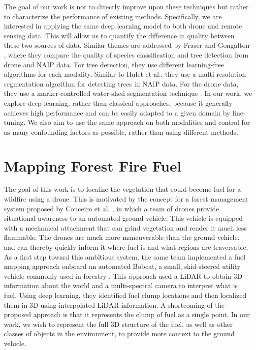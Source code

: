 The goal of our work is not to directly improve upon these techniques but rather to characterize the performance of existing methods. Specifically, we are interested in applying the same deep learning model to both drone and remote sensing data. This will allow us to quantify the difference in quality between these two sources of data. Similar themes are addressed by Fraser and Gongalton \cite{Fraser2021AImagery}, where they compare the quality of species classification and tree detection from drone and NAIP data. For tree detection, they use different learning-free algorithms for each modality. Similar to Hulet et al., they use a multi-resolution segmentation algorithm \cite{Baatz2000MultiresolutionS} for detecting trees in NAIP data. For the drone data, they use a marker-controlled water-shed segmentation technique \cite{Chen2018ReviewEvaluation}. In our work, we explore deep learning, rather than classical approaches, because it generally achieves high performance and can be easily adapted to a given domain by fine-tuning. We also aim to use the same approach on both modalities and control for as many confounding factors as possible, rather than using different methods.



\section{Mapping Forest Fire Fuel}
The goal of this work is to localize the vegetation that could become fuel for a wildfire using a drone. This is motivated by the concept for a forest management system proposed by Couceiro et al. \cite{Couceiro2019SEMFIRE:Systems}, in which a team of drones provide situational awareness to an automated ground vehicle. This vehicle is equipped with a mechanical attachment that can grind vegetation and render it much less flammable. The drones are much more maneuverable than the ground vehicle, and can thereby quickly inform it where fuel is and what regions are traversable. As a first step toward this ambitious system, the same team implemented a fuel mapping approach onboard an automated Bobcat, a small, skid-steered utility vehicle commonly used in forestry \cite{Andrada2022IntegrationRobotics}. This approach used a LiDAR to obtain 3D information about the world and a multi-spectral camera to interpret what is fuel. Using deep learning, they identified fuel clump locations and then localized them in 3D using interpolated LiDAR information. A shortcoming of the proposed approach is that it represents the clump of fuel as a single point. In our work, we wish to represent the full 3D structure of the fuel, as well as other classes of objects in the environment, to provide more context to the ground vehicle. 


